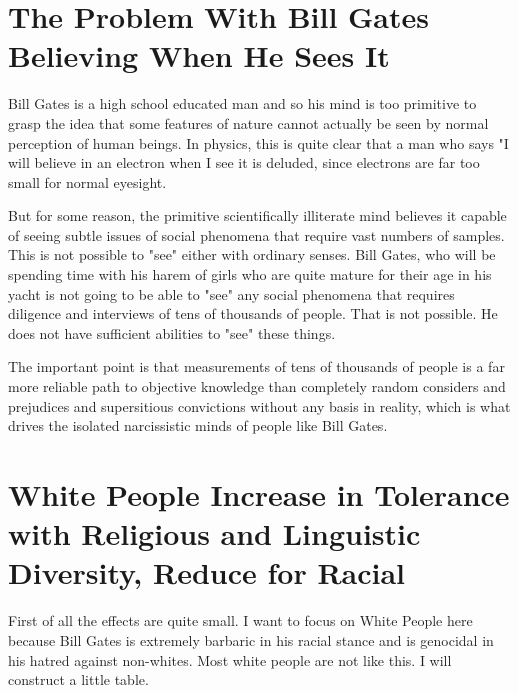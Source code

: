 \documentclass{amsart}
\begin{document}
\section{The Problem With Bill Gates Believing When He Sees It}

Bill Gates is a high school educated man and so his mind is too primitive to grasp the idea that some features of nature cannot actually be seen by normal perception of human beings.  In physics, this is quite clear that a man who says "I will believe in an electron when I see it is deluded, since electrons are far too small for normal eyesight.  

But for some reason, the primitive scientifically illiterate mind believes it capable of seeing subtle issues of social phenomena that require vast numbers of samples.  This is not possible to "see" either with ordinary senses.  Bill Gates, who will be spending time with his harem of girls who are quite mature for their age in his yacht is not going to be able to "see" any social phenomena that requires diligence and interviews of tens of thousands of people.   That is not possible.  He does not have sufficient abilities to "see" these things.

The important point is that measurements of tens of thousands of people is a far more reliable path to objective knowledge than completely random considers and prejudices and supersitious convictions without any basis in reality, which is what drives the isolated narcissistic minds of people like Bill Gates.

\section{White People Increase in Tolerance with Religious and Linguistic Diversity, Reduce for Racial}

First of all the effects are quite small.  I want to focus on White People here because Bill Gates is extremely barbaric in his racial stance and is genocidal in his hatred against non-whites.  Most white people are not like this.  I will construct a little table.
\end{document}
